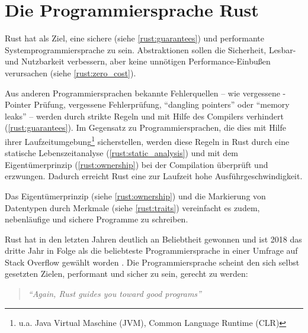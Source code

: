 
\chapter{Die Programmiersprache Rust}
\label{rust}

Rust hat als Ziel, eine sichere (siehe \autoref{rust:guarantees}) und performante Systemprogrammiersprache zu sein.
Abstraktionen sollen die Sicherheit, Lesbar- und Nutzbarkeit verbessern, aber keine unnötigen Performance-Einbußen verursachen (siehe \autoref{rust:zero_cost}).

Aus anderen Programmiersprachen bekannte Fehlerquellen -- wie vergessene -Pointer Prüfung, vergessene Fehlerprüfung, \enquote{dangling pointers} oder \enquote{memory leaks} --  werden durch strikte Regeln und mit Hilfe des Compilers verhindert (\autoref{rust:guarantees}).
Im Gegensatz zu Programmiersprachen, die dies mit Hilfe ihrer Laufzeitumgebung\footnote{u.a. Java Virtual Maschine (JVM), Common Language Runtime (CLR)} sicherstellen, werden diese Regeln in Rust durch eine statische Lebenszeitanalyse (\autoref{rust:static_analysis}) und mit dem Eigentümerprinzip (\autoref{rust:ownership}) bei der Compilation überprüft und erzwungen.
Dadurch erreicht Rust eine zur Laufzeit hohe Ausführgeschwindigkeit.

Das Eigentümerprinzip (siehe \autoref{rust:ownership}) und die Markierung von Datentypen durch Merkmale (siehe \autoref{rust:traits}) vereinfacht es zudem, nebenläufige und sichere Programme zu schreiben.

Rust hat in den letzten Jahren deutlich an Beliebtheit gewonnen und ist 2018 das dritte Jahr in Folge als die beliebteste Programmiersprache in einer Umfrage auf Stack Overflow gewählt worden \cite{rust:stack_overflow:mose_loved}.
Die Programmiersprache scheint den sich selbst gesetzten Zielen, performant und sicher zu sein, gerecht zu werden:

\begin{quotation}
	\textit{\enquote{Again, Rust guides you toward good programs}}
	\cite[497]{rust:orly_programming}
\end{quotation}

